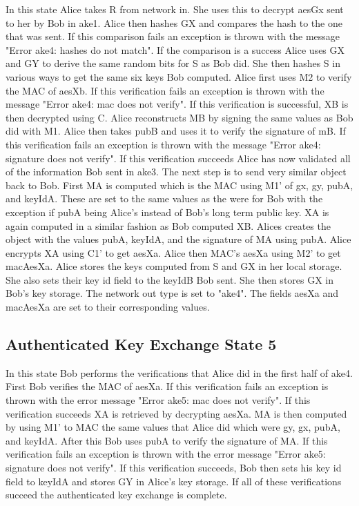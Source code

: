 In this state Alice takes R from network in. She uses this to decrypt aesGx sent to her by Bob in ake1. Alice then hashes GX and compares the hash to the one that was sent. If this comparison fails an exception is thrown with the message "Error ake4: hashes do not match". If the comparison is a success Alice uses GX and GY to derive the same random bits for S as Bob did. She then hashes S in various ways to get the same six keys Bob computed. Alice first uses M2 to verify the MAC of aesXb. If this verification fails an exception is thrown with the message "Error ake4: mac does not verify". If this verification is successful, XB is then decrypted using C. Alice reconstructs MB by signing the same values as Bob did with M1. Alice then takes pubB and uses it to verify the signature of mB. If this verification fails an exception is thrown with the message "Error ake4: signature does not verify". If this verification succeeds Alice has now validated all of the information Bob sent in ake3. The next step is to send very similar object back to Bob. First MA is computed which is the MAC using M1' of gx, gy, pubA, and keyIdA. These are set to the same values as the were for Bob with the exception if pubA being Alice's instead of Bob's long term public key. XA is again computed in a similar fashion as Bob computed XB. Alices creates the object with the values pubA, keyIdA, and the signature of MA using pubA. Alice encrypts XA using C1' to get aesXa. Alice then MAC's aesXa using M2' to get macAesXa. Alice stores the keys computed from S and GX in her local storage. She also sets their key id field to the keyIdB Bob sent. She then stores GX in Bob's key storage. The network out type is set to "ake4". The fields aesXa and macAesXa are set to their corresponding values.


\subsection{Authenticated Key Exchange State 5}


In this state Bob performs the verifications that Alice did in the first half of ake4. First Bob verifies the MAC of aesXa. If this verification fails an exception is thrown with the error message "Error ake5: mac does not verify". If this verification succeeds XA is retrieved by decrypting aesXa. MA is then computed by using M1' to MAC the same values that Alice did which were gy, gx, pubA, and keyIdA. After this Bob uses pubA to verify the signature of MA. If this verification fails an exception is thrown with the error message "Error ake5: signature does not verify". If this verification succeeds, Bob then sets his key id field to keyIdA and stores GY in Alice's key storage. If all of these verifications succeed the authenticated key exchange is complete.


